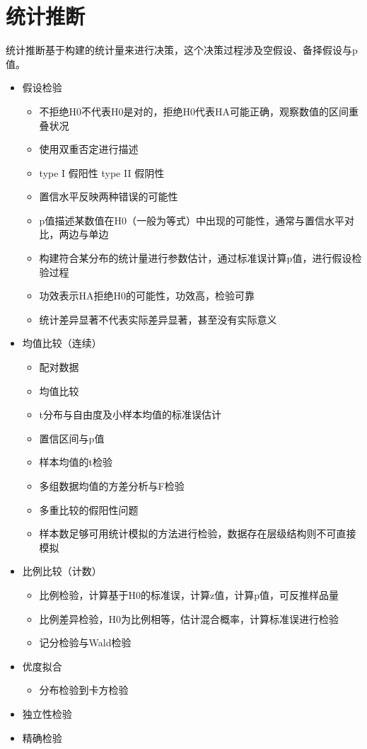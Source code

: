 \documentclass[
]{book}
\providecommand{\tightlist}{%
  \setlength{\itemsep}{0pt}\setlength{\parskip}{0pt}}
\begin{document}
\hypertarget{si}{%
\section{统计推断}\label{si}}

统计推断基于构建的统计量来进行决策，这个决策过程涉及空假设、备择假设与p值。

\begin{itemize}
\item
  假设检验

  \begin{itemize}
  \tightlist
  \item
    不拒绝H0不代表H0是对的，拒绝H0代表HA可能正确，观察数值的区间重叠状况
  \item
    使用双重否定进行描述
  \item
    type I 假阳性 type II 假阴性
  \item
    置信水平反映两种错误的可能性
  \item
    p值描述某数值在H0（一般为等式）中出现的可能性，通常与置信水平对比，两边与单边
  \item
    构建符合某分布的统计量进行参数估计，通过标准误计算p值，进行假设检验过程
  \item
    功效表示HA拒绝H0的可能性，功效高，检验可靠
  \item
    统计差异显著不代表实际差异显著，甚至没有实际意义
  \end{itemize}
\item
  均值比较（连续）

  \begin{itemize}
  \tightlist
  \item
    配对数据
  \item
    均值比较
  \item
    t分布与自由度及小样本均值的标准误估计
  \item
    置信区间与p值
  \item
    样本均值的t检验
  \item
    多组数据均值的方差分析与F检验
  \item
    多重比较的假阳性问题
  \item
    样本数足够可用统计模拟的方法进行检验，数据存在层级结构则不可直接模拟
  \end{itemize}
\item
  比例比较（计数）

  \begin{itemize}
  \tightlist
  \item
    比例检验，计算基于H0的标准误，计算z值，计算p值，可反推样品量
  \item
    比例差异检验，H0为比例相等，估计混合概率，计算标准误进行检验
  \item
    记分检验与Wald检验
  \end{itemize}
\item
  优度拟合

  \begin{itemize}
  \tightlist
  \item
    分布检验到卡方检验
  \end{itemize}
\item
  独立性检验
\item
  精确检验
\end{itemize}
\end{document}
